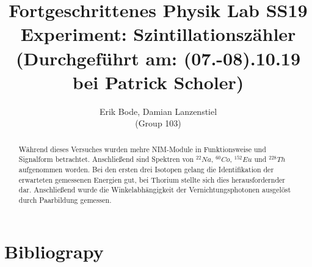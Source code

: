\documentclass[30pt,a4paper]{article}
\title{
	\large Fortgeschrittenes Physik Lab	SS19 \\[4mm]
	\textbf{\LARGE Experiment: Szintillationszähler
	} \\[4mm]
	(Durchgeführt am: (07.-08).10.19 bei Patrick Scholer) \\}
\author{Erik Bode, Damian Lanzenstiel \\ (Group 103)}
\begin{document}
	
	\begin{titlepage}
		\maketitle
		\vspace{2cm}
		\begin{abstract}
			Während dieses Versuches wurden mehre NIM-Module in Funktionsweise und Signalform betrachtet. Anschließend sind Spektren von $^{22}Na$, $^{60}Co$, $^{152}Eu$ und $^{228}Th$ aufgenommen worden. Bei den ersten drei Isotopen gelang die Identifikation der erwarteten gemessenen Energien gut, bei Thorium stellte sich dies herausfordernder dar. Anschließend wurde die Winkelabhängigkeit der Vernichtungsphotonen ausgelöst durch Paarbildung gemessen.
		\end{abstract}
	\end{titlepage}
	\newpage
	\tableofcontents
	\listoftables
	\listoffigures
	\newpage
	
	
	
	
	
	

	\section{Bibliograpy}
	
	
	
\end{document}
